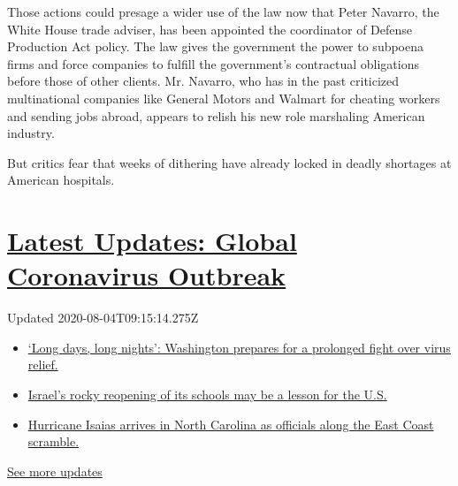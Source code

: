 Those actions could presage a wider use of the law now that Peter
Navarro, the White House trade adviser, has been appointed the
coordinator of Defense Production Act policy. The law gives the
government the power to subpoena firms and force companies to fulfill
the government's contractual obligations before those of other clients.
Mr. Navarro, who has in the past criticized multinational companies like
General Motors and Walmart for cheating workers and sending jobs abroad,
appears to relish his new role marshaling American industry.

But critics fear that weeks of dithering have already locked in deadly
shortages at American hospitals.

\hypertarget{latest-updates-global-coronavirus-outbreak}{%
\section{\texorpdfstring{\href{https://www.nytimes3xbfgragh.onion/2020/08/04/world/coronavirus-covid-19.html?action=click\&pgtype=Article\&state=default\&region=MAIN_CONTENT_1\&context=storylines_live_updates}{Latest
Updates: Global Coronavirus
Outbreak}}{Latest Updates: Global Coronavirus Outbreak}}\label{latest-updates-global-coronavirus-outbreak}}

Updated 2020-08-04T09:15:14.275Z

\begin{itemize}
\tightlist
\item
  \href{https://www.nytimes3xbfgragh.onion/2020/08/04/world/coronavirus-covid-19.html?action=click\&pgtype=Article\&state=default\&region=MAIN_CONTENT_1\&context=storylines_live_updates\#link-6b644638}{`Long
  days, long nights': Washington prepares for a prolonged fight over
  virus relief.}
\item
  \href{https://www.nytimes3xbfgragh.onion/2020/08/04/world/coronavirus-covid-19.html?action=click\&pgtype=Article\&state=default\&region=MAIN_CONTENT_1\&context=storylines_live_updates\#link-7af9fca0}{Israel's
  rocky reopening of its schools may be a lesson for the U.S.}
\item
  \href{https://www.nytimes3xbfgragh.onion/2020/08/04/world/coronavirus-covid-19.html?action=click\&pgtype=Article\&state=default\&region=MAIN_CONTENT_1\&context=storylines_live_updates\#link-33bf9168}{Hurricane
  Isaias arrives in North Carolina as officials along the East Coast
  scramble.}
\end{itemize}

\href{https://www.nytimes3xbfgragh.onion/2020/08/04/world/coronavirus-covid-19.html?action=click\&pgtype=Article\&state=default\&region=MAIN_CONTENT_1\&context=storylines_live_updates}{See
more updates}

